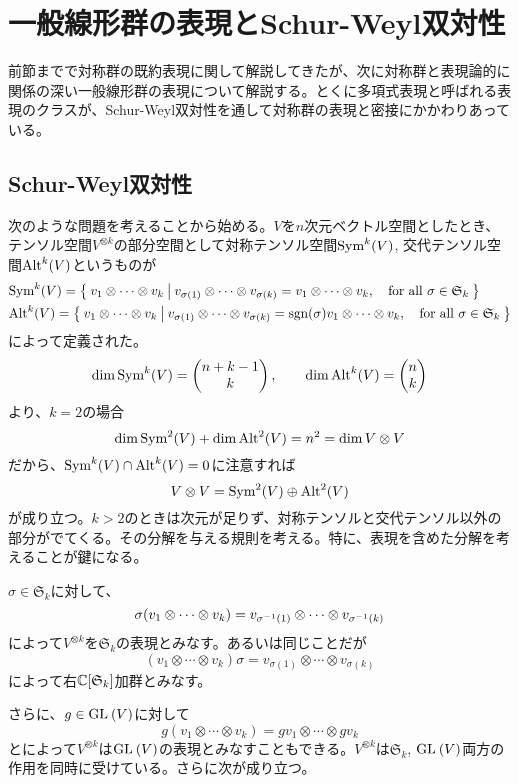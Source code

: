 \documentclass{ltjsreport}
\begin{document}
\section{一般線形群の表現とSchur-Weyl双対性}

前節までで対称群の既約表現に関して解説してきたが、次に対称群と表現論的に関係の深い一般線形群の表現について解説する。とくに多項式表現と呼ばれる表現のクラスが、Schur-Weyl双対性を通して対称群の表現と密接にかかわりあっている。


\subsection{Schur-Weyl双対性}

次のような問題を考えることから始める。$V$を$n$次元ベクトル空間としたとき、テンソル空間$V^{\otimes k}$の部分空間として対称テンソル空間$\text{Sym}^k(V)$, 交代テンソル空間$\text{Alt}^k(V)$というものが
\begin{align*}
  &\text{Sym}^k(V)=\left\{\:v_1\otimes\cdots\otimes v_k\:\middle|\:v_{\sigma(1)}\otimes\cdots\otimes v_{\sigma (k)}=v_1\otimes\cdots\otimes v_k,\quad\text{for all $\sigma\in\mathfrak{S}_k$}\:\right\}\\
  &\text{Alt}^k(V)=\left\{\:v_1\otimes\cdots\otimes v_k\:\middle|\:v_{\sigma(1)}\otimes\cdots\otimes v_{\sigma (k)}=\mathrm{sgn}(\sigma)v_1\otimes\cdots\otimes v_k,\quad\text{for all $\sigma\in\mathfrak{S}_k$}\:\right\}
\end{align*}
によって定義された。
\[
\dim\text{Sym}^k(V)=\begin{pmatrix} n+k-1\\k \end{pmatrix},\qquad\dim\text{Alt}^k(V)=\begin{pmatrix} n\\k \end{pmatrix}  
\]
より、$k=2$の場合
\[
\dim\text{Sym}^2(V)+\dim\text{Alt}^2(V)=n^2=\dim V\otimes V  
\]
だから、$\text{Sym}^k(V)\cap\text{Alt}^k(V)=0$に注意すれば
\[
V\otimes V=\text{Sym}^2(V)\oplus\text{Alt}^2(V)  
\]
が成り立つ。$k>2$のときは次元が足りず、対称テンソルと交代テンソル以外の部分がでてくる。その分解を与える規則を考える。特に、表現を含めた分解を考えることが鍵になる。

$\sigma\in \mathfrak{S}_k$に対して、
\[
\sigma(v_1\otimes\cdots\otimes v_k)=v_{\sigma^{-1}(1)}\otimes\cdots\otimes v_{\sigma^{-1}(k)}  
\]
によって$V^{\otimes k}$を$\mathfrak{S}_k$の表現とみなす。あるいは同じことだが
\[
  (v_1\otimes\cdots\otimes v_k)\sigma=v_{\sigma(1)}\otimes\cdots\otimes v_{\sigma(k)}
\]
によって右$\mathbb{C}[\mathfrak{S}_k]$加群とみなす。

さらに、$g\in \text{GL}\:(V)$に対して
\[
g(v_1\otimes\cdots\otimes v_k)=gv_1\otimes\cdots\otimes gv_k  
\]
とによって$V^{\otimes k}$は$\text{GL}\:(V)$の表現とみなすこともできる。$V^{\otimes k}$は$\mathfrak{S}_k$, $\text{GL}\:(V)$両方の作用を同時に受けている。さらに次が成り立つ。
\end{document}
